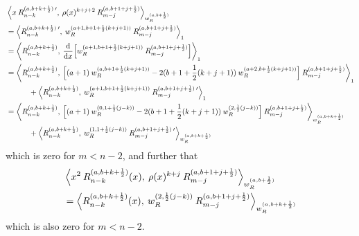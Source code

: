 \documentclass[11pt, oneside]{article}   	%
\newcommand{\half}{\frac{1}{2}}
\newcommand{\ddx}{\frac{\mathrm{d}}{\mathrm{d}x}}
\newcommand{\pddx}{\frac{\partial}{\partial x}}
\newcommand{\hdop}{H}
\newcommand{\hdopnkab}{\hdop_{n,k}^{(a,b)}}
\newcommand{\genjac}{R}
\newcommand{\genjacnmk}{\genjac_{n-k}}
\newcommand{\genjacmmj}{\genjac_{m-j}}
\newcommand{\genjacw}{w_\genjac}
\begin{document}
\begin{align*}
	&\ip< x \: \genjacnmk^{(a, b+k+\half) \: \prime}, \: \rho(x)^{k+j+2} \: \genjacmmj^{(a, b+1+j+\half)} >_{\genjacw^{(a, b+\half)}}  \\
	&= \ip<\genjacnmk^{(a, b+k+\half) \: \prime}, \: \genjacw^{(a+1, b+1+\half(k+j+1))} \: \genjacmmj^{(a, b+1+j+\half)} >_1 \\
	&= \ip<\genjacnmk^{(a, b+k+\half)}, \: \ddx \Big[\genjacw^{(a+1, b+1+\half(k+j+1))} \: \genjacmmj^{(a, b+1+j+\half)} \Big] >_1 \\
	&= \ip<\genjacnmk^{(a, b+k+\half)}, \: \Big[(a+1) \: \genjacw^{(a, b+1+\half(k+j+1))} -2(b+1+\half(k+j+1)) \: \genjacw^{(a+2, b+\half(k+j+1))} \Big] \: \genjacmmj^{(a, b+1+j+\half)} >_1 \\
		&\quad \quad \quad + \ip<\genjacnmk^{(a, b+k+\half)}, \: \genjacw^{(a+1, b+1+\half(k+j+1))} \: \genjacmmj^{(a, b+1+j+\half) \: \prime}>_1 \\
	&= \ip<\genjacnmk^{(a, b+k+\half)}, \: \Big[(a+1) \: \genjacw^{(0,1+\half(j-k))} -2(b+1+\half(k+j+1)) \: \genjacw^{(2, \half(j-k))} \Big] \: \genjacmmj^{(a, b+1+j+\half)} >_{\genjacw^{(a, b+k+\half)}} \\
		&\quad \quad \quad + \ip<\genjacnmk^{(a, b+k+\half)}, \: \genjacw^{(1, 1+\half(j-k))} \: \genjacmmj^{(a, b+1+j+\half) \: \prime}>_{\genjacw^{(a, b+k+\half)}}
\end{align*}
which is zero for $m < n - 2$, and further that
\begin{align*}
	&\ip< x^2 \: \genjacnmk^{(a, b+k+\half)}(x), \: \rho(x)^{k+j} \: \genjacmmj^{(a, b+1+j+\half)} >_{\genjacw^{(a, b+\half)}} \\
	&= \ip< \genjacnmk^{(a, b+k+\half)}(x), \: \genjacw^{(2, \half(j-k))} \: \genjacmmj^{(a, b+1+j+\half)} >_{\genjacw^{(a, b+k+\half)}}
\end{align*}
which is also zero for $m < n - 2$.
\end{document}
